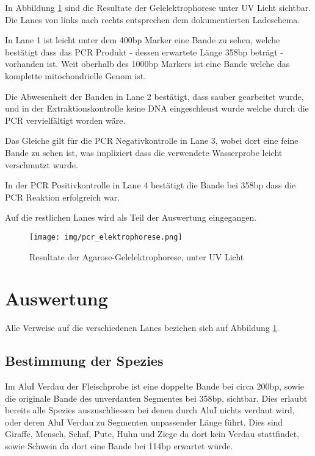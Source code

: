 \documentclass[a4paper,english]{scrreprt}
\begin{document}
In Abbildung \ref{fig:pcr_elektrophorese} sind die Resultate der
Gelelektrophorese unter UV Licht sichtbar. Die Lanes von links nach rechts
entsprechen dem dokumentierten Ladeschema.

In Lane 1 ist leicht unter dem 400bp Marker eine Bande zu sehen, welche
bestätigt dass das PCR Produkt - dessen erwartete Länge 358bp beträgt -
vorhanden ist. Weit oberhalb des 1000bp Markers ist eine Bande welche das
komplette mitochondrielle Genom ist.

Die Abwesenheit der Banden in Lane 2 bestätigt, dass sauber gearbeitet wurde,
und in der Extraktionskontrolle keine DNA eingeschleust wurde welche durch die
PCR vervielfältigt worden wäre.

Das Gleiche gilt für die PCR Negativkontrolle in Lane 3, wobei dort eine feine
Bande zu sehen ist, was impliziert dass die verwendete Wasserprobe leicht
verschmutzt wurde.

In der PCR Positivkontrolle in Lane 4 bestätigt die Bande bei 358bp dass die
PCR Reaktion erfolgreich war.

Auf die restlichen Lanes wird als Teil der Auswertung eingegangen.

\begin{landscape}

\begin{figure}[h]
	\centering
	\texttt{[image: img/pcr\_elektrophorese.png]}
	\caption{Resultate der Agarose-Gelelektrophorese, unter UV Licht}
	\label{fig:pcr_elektrophorese}
\end{figure}

\end{landscape}

\chapter{Auswertung}

Alle Verweise auf die verschiedenen Lanes beziehen sich auf Abbildung
\ref{fig:pcr_elektrophorese}.

\section{Bestimmung der Spezies}

Im AluI Verdau der Fleischprobe ist eine doppelte Bande bei circa 200bp, sowie
die originale Bande des unverdauten Segmentes bei 358bp, sichtbar. Dies erlaubt
bereits alle Spezies auszuschliessen bei denen durch AluI nichts verdaut wird,
oder deren AluI Verdau zu Segmenten unpassender Länge führt. Dies sind Giraffe,
Mensch, Schaf, Pute, Huhn und Ziege da dort kein Verdau stattfindet, sowie
Schwein da dort eine Bande bei 114bp erwartet würde.
\end{document}
